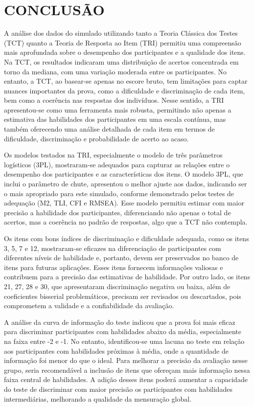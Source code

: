 \chapter{CONCLUSÃO}


	

A análise dos dados do simulado utilizando tanto a Teoria Clássica dos Testes (TCT) quanto a Teoria de Resposta ao Item (TRI) permitiu uma compreensão mais aprofundada sobre o desempenho dos participantes e a qualidade dos itens. Na TCT, os resultados indicaram uma distribuição de acertos concentrada em torno da mediana, com uma variação moderada entre os participantes. No entanto, a TCT, ao basear-se apenas no escore bruto, tem limitações para captar nuances importantes da prova, como a dificuldade e discriminação de cada item, bem como a coerência nas respostas dos indivíduos. Nesse sentido, a TRI apresentou-se como uma ferramenta mais robusta, permitindo não apenas a estimativa das habilidades dos participantes em uma escala contínua, mas também oferecendo uma análise detalhada de cada item em termos de dificuldade, discriminação e probabilidade de acerto ao acaso.

Os modelos testados na TRI, especialmente o modelo de três parâmetros logísticos (3PL), mostraram-se adequados para capturar as relações entre o desempenho dos participantes e as características dos itens. O modelo 3PL, que inclui o parâmetro de chute, apresentou o melhor ajuste aos dados, indicando ser o mais apropriado para este simulado, conforme demonstrado pelos testes de adequação (M2, TLI, CFI e RMSEA). Esse modelo permitiu estimar com maior precisão a habilidade dos participantes, diferenciando não apenas o total de acertos, mas a coerência no padrão de respostas, algo que a TCT não contempla.

Os itens com bons índices de discriminação e dificuldade adequada, como os itens 3, 5, 7 e 12, mostraram-se eficazes na diferenciação de participantes com diferentes níveis de habilidade e, portanto, devem ser preservados no banco de itens para futuras aplicações. Esses itens fornecem informações valiosas e contribuem para a precisão das estimativas de habilidade. Por outro lado, os itens 21, 27, 28 e 30, que apresentaram discriminação negativa ou baixa, além de coeficientes bisserial problemáticos, precisam ser revisados ou descartados, pois comprometem a validade e a confiabilidade da avaliação.

A análise da curva de informação do teste indicou que a prova foi mais eficaz para discriminar participantes com habilidades abaixo da média, especialmente na faixa entre -2 e -1. No entanto, identificou-se uma lacuna no teste em relação aos participantes com habilidades próximas à média, onde a quantidade de informação foi menor do que o ideal. Para melhorar a precisão da avaliação nesse grupo, seria recomendável a inclusão de itens que ofereçam mais informação nessa faixa central de habilidades. A adição desses itens poderá aumentar a capacidade do teste de discriminar com maior precisão os participantes com habilidades intermediárias, melhorando a qualidade da mensuração global.

